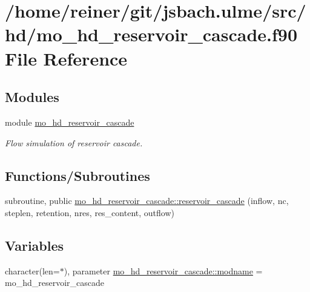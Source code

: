 \hypertarget{mo__hd__reservoir__cascade_8f90}{}\section{/home/reiner/git/jsbach.ulme/src/hd/mo\+\_\+hd\+\_\+reservoir\+\_\+cascade.f90 File Reference}
\label{mo__hd__reservoir__cascade_8f90}
\subsection*{Modules}
\begin{DoxyCompactItemize}
\item 
module \hyperlink{namespacemo__hd__reservoir__cascade}{mo\+\_\+hd\+\_\+reservoir\+\_\+cascade}
\begin{DoxyCompactList}\small\item\em Flow simulation of reservoir cascade. \end{DoxyCompactList}\end{DoxyCompactItemize}
\subsection*{Functions/\+Subroutines}
\begin{DoxyCompactItemize}
\item 
subroutine, public \hyperlink{namespacemo__hd__reservoir__cascade_a2fa442fd7d7849b36ae0cc5b9f39cbcd}{mo\+\_\+hd\+\_\+reservoir\+\_\+cascade\+::reservoir\+\_\+cascade} (inflow, nc, steplen, retention, nres, res\+\_\+content, outflow)
\end{DoxyCompactItemize}
\subsection*{Variables}
\begin{DoxyCompactItemize}
\item 
character(len=$\ast$), parameter \hyperlink{namespacemo__hd__reservoir__cascade_a8b0cd1df229795ce555d9973dbd65c30}{mo\+\_\+hd\+\_\+reservoir\+\_\+cascade\+::modname} = \textquotesingle{}mo\+\_\+hd\+\_\+reservoir\+\_\+cascade\textquotesingle{}
\end{DoxyCompactItemize}
